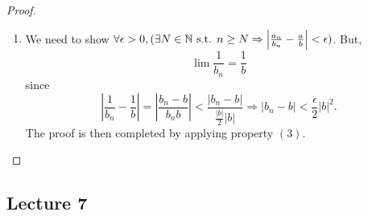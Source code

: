 \begin{thm}{}{\label{thm:aolt}}
\begin{proof}
\begin{enumerate}
\begin{align*}
                &\leq |a_n b_n - ab_n| + |ab_n - ab| \\
                &= |a_n - a||b_n| + |a||b_n - b| \\
                &\leq M|a_n - a| + |a||b_n - b| \tag{assuming $|b_n| < M\, \forall n$}
            \end{align*}
            Then, since $\lim a_n = a, \exists N_2 \in \NN \Rightarrow |a_n - a| < \frac{\epsilon}{2M}$ and $\lim b_n = b \Rightarrow, \exists N_{2} \in \NN \Rightarrow |b_n - b| < \frac{\epsilon}{2|a|}$ for $n > N_1$ and $n > N_2$, respectively. Take $N = \max\braces{N_1, N_2}$, then for $n \geq N$, 
            \[
                |a_n b_n - ab| \leq |a_n - a||b_n| + |a||b_n - b| < \frac{\epsilon}{2} + \frac{\epsilon}{2} = \epsilon 
            \]
            \item We need to show $\forall \epsilon > 0, (\exists N \in \mathbb N \text{ s.t. } n \geq N \Rightarrow \left|\frac{a_n}{b_n} - \frac{a}{b}\right| < \epsilon)$. But, 
            \[
                \lim \frac{1}{b_n} = \frac{1}{b} 
            \]
            since 
            \[
                \left|\frac{1}{b_n} - \frac{1}{b}\right| = \left|\frac{b_n - b}{b_n b}\right| < \frac{|b_n - b|}{\frac{|b|}{2}|b|} \Rightarrow |b_n - b| < \frac{\epsilon}{2}|b|^2.
            \]
            The proof is then completed by applying property $(3)$.
        \end{enumerate}
    \end{proof}
\end{thm}

\subsection{Lecture 7}
